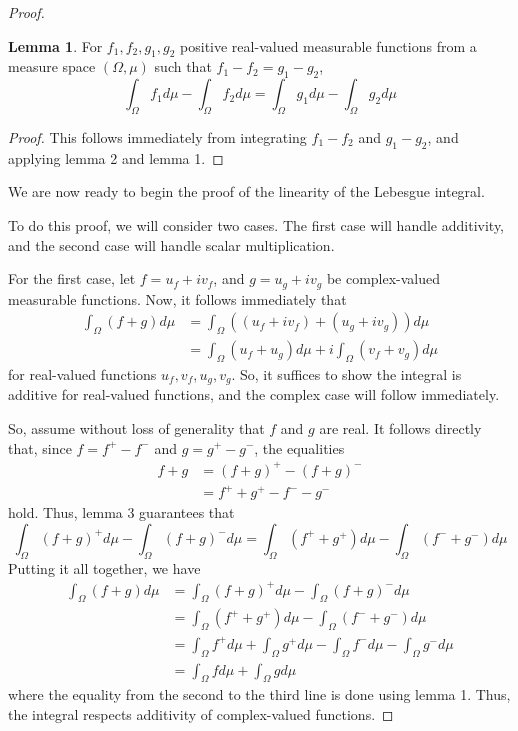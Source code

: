 \documentclass[fontsize=11pt]{scrartcl} %
\numberwithin{equation}{section} %
\numberwithin{figure}{section} %
\numberwithin{table}{section} %
\theoremstyle{definition}
\newtheorem{lemma}{Lemma}
\begin{document}
\begin{proof}
\begin{lemma}
For $f_1,f_2,g_1,g_2$ positive real-valued measurable functions from a measure space
$(\Omega,\mu)$ such that $f_1-f_2 = g_1-g_2$,
\[
\int_{\Omega} f_1d\mu - \int_{\Omega} f_2d\mu = \int_{\Omega} g_1d\mu - \int_{\Omega}g_2d\mu
\]
\end{lemma}

\begin{proof}
This follows immediately from integrating $f_1-f_2$ and $g_1-g_2$, and applying lemma 2
and lemma 1.
\end{proof}
We are now ready to begin the proof of the linearity of the Lebesgue integral.

To do this proof, we will consider two cases. The first case will handle additivity,
and the second case will handle scalar multiplication.

For the first case, let $f=u_f+iv_f$, and $g=u_g+iv_g$ be complex-valued measurable functions.
Now, it follows immediately that
\[
\begin{aligned}
\int_{\Omega} (f+g)d\mu &= \int_{\Omega} ((u_f+iv_f) + (u_g+iv_g))d\mu\\
                        &= \int_{\Omega} (u_f + u_g)d\mu + i\int_{\Omega}(v_f+v_g)d\mu
\end{aligned}
\]
for real-valued functions $u_f,v_f,u_g,v_g$. So, it suffices to show the integral is
additive for real-valued functions, and the complex case will follow immediately.

So, assume without loss of generality that $f$ and $g$ are real. It follows directly that,
since $f=f^+-f^-$ and $g=g^+-g^-$, the equalities
\[
\begin{aligned}
f+g &= (f+g)^+ - (f+g)^-\\
    &= f^+ + g^+ - f^- - g^-
\end{aligned}
\]
hold. Thus, lemma 3 guarantees that
\[
\int_{\Omega}(f+g)^+d\mu - \int_{\Omega}(f+g)^-d\mu = \int_{\Omega}(f^+ + g^+)d\mu -\int_{\Omega}(f^-+g^-)d\mu
\]
Putting it all together, we have
\[
\begin{aligned}
\int_{\Omega}(f+g)d\mu  &= \int_{\Omega}(f+g)^+d\mu - \int_{\Omega}(f+g)^-d\mu\\
                        &= \int_{\Omega}(f^++g^+)d\mu - \int_{\Omega}(f^-+g^-)d\mu\\
                        &= \int_{\Omega}f^+d\mu + \int_{\Omega}g^+d\mu - \int_{\Omega}f^-d\mu-\int_{\Omega}g^-d\mu\\
                        &= \int_{\Omega}fd\mu + \int_{\Omega}gd\mu
\end{aligned}
\]
where the equality from the second to the third line is done using lemma 1.
Thus, the integral respects additivity of complex-valued functions.


\end{proof}
\end{document}
